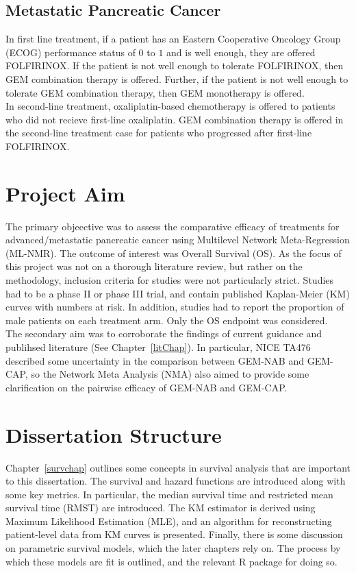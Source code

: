 \subsection{Metastatic Pancreatic Cancer}
In first line treatment, if a patient has an Eastern Cooperative Oncology Group (ECOG) performance status of $0$ to $1$ and is well enough, they are offered FOLFIRINOX. If the patient is not well enough to tolerate FOLFIRINOX, then GEM combination therapy is offered. Further, if the patient is not well enough to tolerate GEM combination therapy, then GEM monotherapy is offered. \\

In second-line treatment, oxaliplatin-based chemotherapy is offered to patients who did not recieve first-line oxaliplatin. GEM combination therapy is offered in the second-line treatment case for patients who progressed after first-line FOLFIRINOX.

\section{Project Aim}\label{sec:aims}
The primary objeective was to assess the comparative efficacy of treatments for advanced/metastatic pancreatic cancer using Multilevel Network Meta-Regression (ML-NMR). The outcome of interest was Overall Survival (OS). As the focus of this project was not on a thorough literature review, but rather on the methodology, inclusion criteria for studies were not particularly strict. Studies had to be a phase II or phase III trial, and contain published Kaplan-Meier (KM) curves with numbers at risk. In addition, studies had to report the proportion of male patients on each treatment arm. Only the OS endpoint was considered. \\

The secondary aim was to corroborate the findings of current guidance and publihsed literature (See Chapter~\ref{litChap}). In particular, NICE TA476~\cite{TA476} described some uncertainty in the comparison between GEM-NAB and GEM-CAP, so the Network Meta Analysis (NMA) also aimed to provide some clarification on the pairwise efficacy of GEM-NAB and GEM-CAP.  

\section{Dissertation Structure}
Chapter~\ref{survchap} outlines some concepts in survival analysis that are important to this dissertation. The survival and hazard functions are introduced along with some key metrics. In particular, the median survival time and restricted mean survival time (RMST) are introduced. The KM estimator is derived using Maximum Likelihood Estimation (MLE), and an algorithm for reconstructing patient-level data from KM curves is presented. Finally, there is some discussion on parametric survival models, which the later chapters rely on. The process by which these models are fit is outlined, and the relevant R package for doing so. \\


